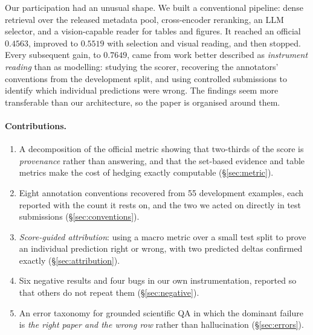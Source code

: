 \documentclass[11pt]{article}
\begin{document}
Our participation had an unusual shape. We built a conventional pipeline: dense
retrieval over the released metadata pool, cross-encoder reranking, an LLM
selector, and a vision-capable reader for tables and figures. It reached an
official $0.4563$, improved to $0.5519$ with selection and visual reading, and
then stopped. Every subsequent gain, to $0.7649$, came from work better described
as \emph{instrument reading} than as modelling: studying the scorer, recovering
the annotators' conventions from the development split, and using controlled
submissions to identify which individual predictions were wrong. The findings
seem more transferable than our architecture, so the paper is organised around
them.

\paragraph{Contributions.}
\begin{enumerate}\itemsep1pt
\item A decomposition of the official metric showing that two-thirds of the
score is \emph{provenance} rather than answering, and that the set-based evidence
and table metrics make the cost of hedging exactly computable
(\S\ref{sec:metric}).
\item Eight annotation conventions recovered from 55 development examples, each
reported with the count it rests on, and the two we acted on directly in test
submissions (\S\ref{sec:conventions}).
\item \emph{Score-guided attribution}: using a macro metric over a small test split
to prove an individual prediction right or wrong, with two predicted deltas
confirmed exactly (\S\ref{sec:attribution}).
\item Six negative results and four bugs in our own instrumentation, reported so
that others do not repeat them (\S\ref{sec:negative}).
\item An error taxonomy for grounded scientific QA in which the dominant failure
is \emph{the right paper and the wrong row} rather than hallucination
(\S\ref{sec:errors}).
\end{enumerate}
\end{document}
